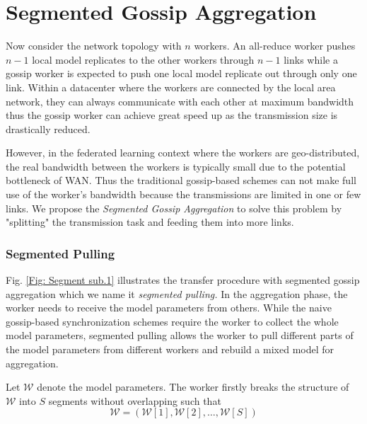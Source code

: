 \section{Segmented Gossip Aggregation}

Now consider the network topology with $n$ workers. An all-reduce worker pushes $n-1$ local model replicates to the other workers through $n-1$ links while a gossip worker is expected to push one local model replicate out through only one link. Within a datacenter where the workers are connected by the local area network, they can always communicate with each other at maximum bandwidth thus the gossip worker can achieve great speed up as the transmission size is drastically reduced.

However, in the federated learning context where the workers are geo-distributed, the real bandwidth between the workers is typically small due to the potential bottleneck of WAN. Thus the traditional gossip-based schemes can not make full use of the worker's bandwidth because the transmissions are limited in one or few links. We propose the \emph{Segmented Gossip Aggregation} to solve this problem by "splitting" the transmission task and feeding them into more links.

%

\subsubsection{Segmented Pulling}

Fig. \ref{Fig: Segment sub.1} illustrates the transfer procedure with segmented gossip aggregation which we name it \emph{segmented pulling.} In the aggregation phase, the worker needs to receive the model parameters from others. While the naive gossip-based synchronization schemes require the worker to collect the whole model parameters, segmented pulling allows the worker to pull different parts of the model parameters from different workers and rebuild a mixed model for aggregation.

Let $\mathcal{W}$ denote the model parameters. The worker firstly breaks the structure of $\mathcal{W}$ into $S$ segments without overlapping such that
\begin{equation}
    \mathcal{W} = (\mathcal{W}[1],\mathcal{W}[2],\dots,\mathcal{W}[S])
\end{equation}

